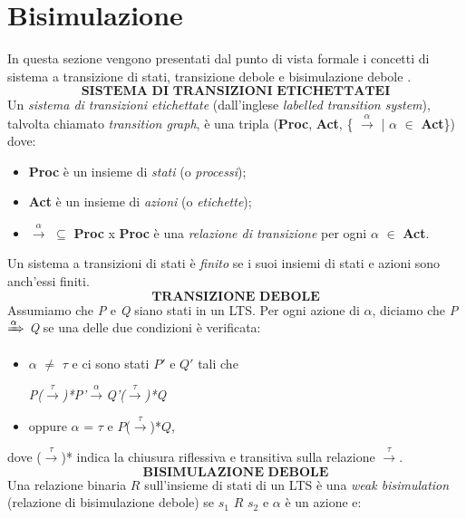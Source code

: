 \documentclass[a4paper,11pt,twoside,openright]{report}
\begin{document}
\chapter{Bisimulazione}
In questa sezione vengono presentati dal punto di vista formale i concetti di sistema a transizione di stati, transizione debole e bisimulazione debole \cite{1}.\\
\[\textbf{SISTEMA DI TRANSIZIONI ETICHETTATEI}\] Un \textit{sistema di transizioni etichettate} (dall'inglese \textit{labelled transition system}), talvolta chiamato \textit{transition graph}, è una tripla (\textbf{Proc}, \textbf{Act}, \{ $\xrightarrow{\alpha}$ | $\alpha$ $\in$ \textbf{Act}\}) dove:

\begin{itemize}
\item \textbf{Proc} è un insieme di \textit{stati} (o \textit{processi});

\item \textbf{Act} è un insieme di \textit{azioni} (o \textit{etichette});

\item $\xrightarrow{\alpha}$ $\subseteq$ \textbf{Proc} x \textbf{Proc} è una \textit{relazione di transizione} per ogni $\alpha$ $\in$ \textbf{Act}.
\end{itemize}

Un sistema a transizioni di stati è \textit{finito} se i suoi insiemi di stati e azioni sono anch'essi finiti.\\

\[\textbf{TRANSIZIONE DEBOLE}\]Assumiamo che \textit{P} e \textit{Q} siano stati in un LTS. Per ogni azione di $\alpha$, diciamo che \textit{P} $\xRightarrow{\alpha}$ \textit{Q} se una delle due condizioni è verificata:

\begin{itemize}
\item $\alpha$ $\neq$ $\tau$ e ci sono stati $P'$ e $Q'$ tali che\\
\centerline{\textit{P($\xrightarrow{\tau}$)*P'$\xrightarrow{\alpha}$Q'($\xrightarrow{\tau}$)*Q}}

\item oppure $\alpha$ = $\tau$ e $P$($\xrightarrow{\tau}$)*$Q$,
\end{itemize}

dove ($\xrightarrow{\tau}$)* indica la chiusura riflessiva e transitiva sulla relazione $\xrightarrow{\tau}$.\\

\[\textbf{BISIMULAZIONE DEBOLE}\] Una relazione binaria $R$ sull'insieme di stati di un LTS è una \textit{weak bisimulation} (relazione di bisimulazione debole) se $s_1$ $R$ $s_2$ e $\alpha$ è un azione e:
\end{document}
